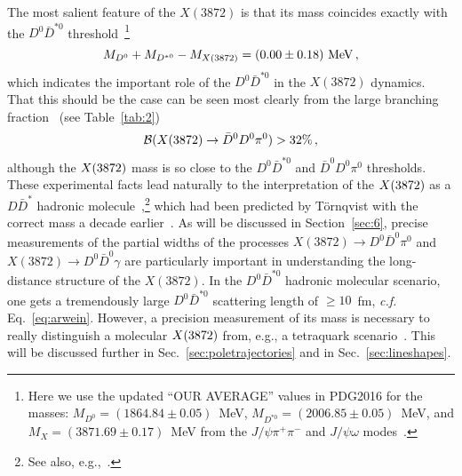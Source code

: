 The most salient feature of the $X(3872)$ is that its mass coincides exactly 
with the $D^0\bar{D}^{*0}$ threshold~\cite{Olive:2016xmw}\footnote{Here we use
the updated ``OUR AVERAGE'' values in PDG2016 for the masses:
$M_{D^0}=(1864.84\pm0.05)$~MeV, $M_{D^{*0}}=(2006.85\pm0.05)$~MeV, and 
$M_{X}=(3871.69\pm0.17)$~MeV from the $J/\psi \pi^+\pi^-$ and $J/\psi\omega$
modes~\cite{Olive:2016xmw}. } 
\begin{equation}
M_{D^0}+M_{D^{*0}}-M_{X(3872)}=(0.00\pm0.18)~\mathrm{MeV}\,,
\end{equation}
which indicates the important role of the $D^0\bar{D}^{*0}$ in 
the $X(3872)$ dynamics. That this should be the case can be seen most clearly 
from the large branching fraction~\cite{Gokhroo:2006bt,Adachi:2008sua} (see 
Table~\ref{tab:2})
\begin{eqnarray}
  \mathcal{B}(X(3872)\to \bar D^{0} D^0\pi^0) > 32\% \, ,
\end{eqnarray}
although the $X(3872)$ mass is so close to the $D^0\bar D^{*0}$ and $\bar D^0
D^0\pi^0$ thresholds.
These experimental facts lead naturally to the interpretation 
of the $X(3872)$ as a $D\bar D^{*}$ hadronic
molecule~\cite{Tornqvist:2003na},\footnote{
See also,
e.g.,~\cite{Tornqvist:2004qy,Swanson:2003tb,Close:2003sg,Pakvasa:2003ea,
Wong:2003xk,Voloshin:2003nt,Swanson:2004pp,AlFiky:2005jd,Braaten:2007dw, 
Fleming:2007rp,Liu:2008tn,Dong:2009yp,Ding:2009vj,Zhang:2009vs,Wang:2009aw, 
Lee:2009hy,Gamermann:2009uq,Mehen:2011ds,Nieves:2011vw, Lee:2011rka,
Nieves:2012tt,Li:2012ss, Li:2012cs,Sun:2012zzd, 
Sun:2012sy,Guo:2013sya,Hidalgo-Duque:2013pva,Wang:2013kva,Yamaguchi:2013ty, 
Guo:2014hqa,He:2014nya, Zhao:2014gqa,Karliner:2015ina,
Baru:2015tfa,Jansen:2015lha,Baru:2015nea,Molnar:2016dbo,
Yang:2017prf}.}
which had been predicted by T\"ornqvist with the correct mass a 
decade earlier~\cite{Tornqvist:1993ng}.
As will be discussed in Section~\ref{sec:6}, precise measurements of the 
partial widths of the processes $X(3872)\to D^0\bar D^0\pi^0$ and $X(3872)\to 
D^0\bar D^0\gamma$ are particularly important in understanding the 
long-distance structure of the $X(3872)$.
%
In the $D^0\bar{D}^{*0}$ hadronic molecular scenario, one gets a tremendously 
large 
$D^0\bar{D}^{*0}$ scattering length of $\geq10$~fm, {\sl c.f.} 
Eq.~\eqref{eq:arwein}. 
However, a precision measurement of its mass is necessary
to really distinguish a molecular $X(3872)$ from, e.g., a tetraquark 
scenario~\cite{Maiani:2004vq,Esposito:2014rxa}. This will be discussed further 
in Sec.~\ref{sec:poletrajectories} and in Sec.~\ref{sec:lineshapes}.


